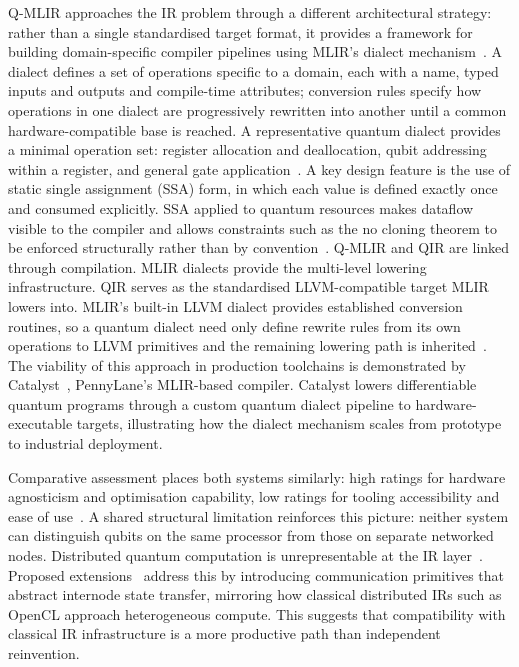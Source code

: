 Q-MLIR approaches the IR problem through a different architectural strategy: rather than a single standardised target format, it provides a framework for building domain-specific compiler pipelines using MLIR's dialect mechanism~\cite{McCaskey2021MLIRDialectQASM}.
A dialect defines a set of operations specific to a domain, each with a name, typed inputs and outputs and compile-time attributes; conversion rules specify how operations in one dialect are progressively rewritten into another until a common hardware-compatible base is reached.
A representative quantum dialect provides a minimal operation set: register allocation and deallocation, qubit addressing within a register, and general gate application~\cite{McCaskey2021MLIRDialectQASM}.
A key design feature is the use of static single assignment (SSA) form, in which each value is defined exactly once and consumed explicitly.
SSA applied to quantum resources makes dataflow visible to the compiler and allows constraints such as the no cloning theorem to be enforced structurally rather than by convention~\cite{McCaskey2021MLIRDialectQASM}.
Q-MLIR and QIR are linked through compilation.
MLIR dialects provide the multi-level lowering infrastructure.
QIR serves as the standardised LLVM-compatible target MLIR lowers into.
MLIR's built-in LLVM dialect provides established conversion routines, so a quantum dialect need only define rewrite rules from its own operations to LLVM primitives and the remaining lowering path is inherited~\cite{McCaskey2021MLIRDialectQASM}.
The viability of this approach in production toolchains is demonstrated by Catalyst~\cite{PennyLaneCatalystMLIRDialectsDocs}, PennyLane's MLIR-based compiler.
Catalyst lowers differentiable quantum programs through a custom quantum dialect pipeline to hardware-executable targets, illustrating how the dialect mechanism scales from prototype to industrial deployment.

Comparative assessment places both systems similarly: high ratings for hardware agnosticism and optimisation capability, low ratings for tooling accessibility and ease of use~\cite{irreview2024}.
A shared structural limitation reinforces this picture: neither system can distinguish qubits on the same processor from those on separate networked nodes.
Distributed quantum computation is unrepresentable at the IR layer~\cite{irreview2024}.
Proposed extensions~\cite{cardama2024netqir} address this by introducing communication primitives that abstract internode state transfer, mirroring how classical distributed IRs such as OpenCL approach heterogeneous compute.
This suggests that compatibility with classical IR infrastructure is a more productive path than independent reinvention.

